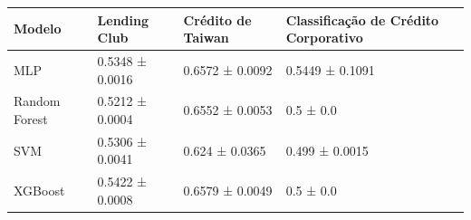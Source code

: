 \begin{tabular}{llll}
\toprule
Modelo & Lending Club & Crédito de Taiwan & Classificação de Crédito Corporativo \\
\midrule
MLP & 0.5348 ± 0.0016 & 0.6572 ± 0.0092 & 0.5449 ± 0.1091 \\
Random Forest & 0.5212 ± 0.0004 & 0.6552 ± 0.0053 & 0.5 ± 0.0 \\
SVM & 0.5306 ± 0.0041 & 0.624 ± 0.0365 & 0.499 ± 0.0015 \\
XGBoost & 0.5422 ± 0.0008 & 0.6579 ± 0.0049 & 0.5 ± 0.0 \\
\bottomrule
\end{tabular}
